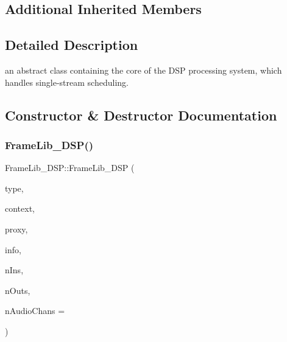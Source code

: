 \subsection*{Additional Inherited Members}


\subsection{Detailed Description}
an abstract class containing the core of the D\+SP processing system, which handles single-\/stream scheduling. 

\subsection{Constructor \& Destructor Documentation}
\mbox{\label{class_frame_lib___d_s_p_a05ee5380cce6fa82c2b91c3f08693cc0}} 
\subsubsection{\texorpdfstring{Frame\+Lib\+\_\+\+D\+S\+P()}{FrameLib\_DSP()}\hspace{0.1cm}{\footnotesize\ttfamily [1/2]}}
{\footnotesize\ttfamily Frame\+Lib\+\_\+\+D\+S\+P\+::\+Frame\+Lib\+\_\+\+D\+SP (\begin{DoxyParamCaption}\item[{\hyperlink{_frame_lib___types_8h_a842c5e2e69277690b064bf363c017980}{Object\+Type}}]{type,  }\item[{\hyperlink{class_frame_lib___context}{Frame\+Lib\+\_\+\+Context}}]{context,  }\item[{\hyperlink{struct_frame_lib___proxy}{Frame\+Lib\+\_\+\+Proxy} $\ast$}]{proxy,  }\item[{\hyperlink{class_frame_lib___parameters_1_1_info}{Frame\+Lib\+\_\+\+Parameters\+::\+Info} $\ast$}]{info,  }\item[{unsigned long}]{n\+Ins,  }\item[{unsigned long}]{n\+Outs,  }\item[{unsigned long}]{n\+Audio\+Chans = {} }\end{DoxyParamCaption})}

\mbox{\label{class_frame_lib___d_s_p_a2cf489678b72fe7e46956e69fac182ed}} 
